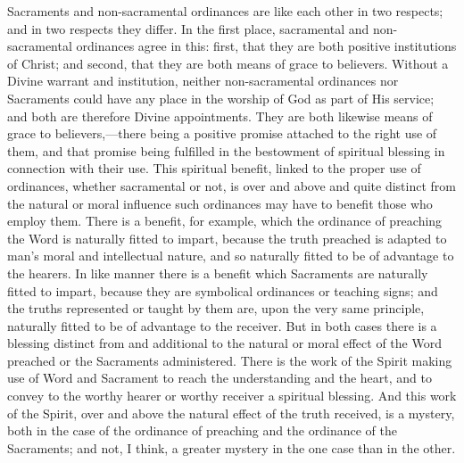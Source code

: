 \documentclass[
  english,
]{book}
\begin{document}
Sacraments and non-sacramental ordinances are like each other in two respects; and in two respects they differ. In the first place, sacramental and non-sacramental ordinances agree in this: first, that they are both positive institutions of Christ; and second, that they are both means of grace to believers. Without a Divine warrant and institution, neither non-sacramental ordinances nor Sacraments could have any place in the worship of God as part of His service; and both are therefore Divine appointments. They are both likewise means of grace to believers,---there being a positive promise attached to the right use of them, and that promise being fulfilled in the bestowment of spiritual blessing in connection with their use. This spiritual benefit, linked to the proper use of ordinances, whether sacramental or not, is over and above and quite distinct from the natural or moral influence such ordinances may have to benefit those who employ them. There is a benefit, for example, which the ordinance of preaching the Word is naturally fitted to impart, because the truth preached is adapted to man's moral and intellectual nature, and so naturally fitted to be of advantage to the hearers. In like manner there is a benefit which Sacraments are naturally fitted to impart, because they are symbolical ordinances or teaching signs; and the truths represented or taught by them are, upon the very same principle, naturally fitted to be of advantage to the receiver. But in both cases there is a blessing distinct from and additional to the natural or moral effect of the Word preached or the Sacraments administered. There is the work of the Spirit making use of Word and Sacrament to reach the understanding and the heart, and to convey to the worthy hearer or worthy receiver a spiritual blessing. And this work of the Spirit, over and above the natural effect of the truth received, is a mystery, both in the case of the ordinance of preaching and the ordinance of the Sacraments; and not, I think, a greater mystery in the one case than in the other.
\end{document}
